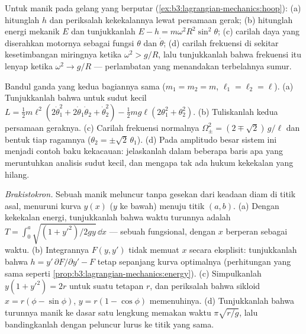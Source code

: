 \begin{exercise}[$\star\star$]\label{exo:b3:lagrangian-mechanics:9}
Untuk manik pada gelang yang berputar
(\cref{ex:b3:lagrangian-mechanics:hoop}): (a) hitunglah 
$h$ dan periksalah kekekalannya lewat persamaan gerak; (b) hitunglah
energi mekanik $E$ dan tunjukkanlah $E - h =
m\omega^2R^2\sin^2\theta$; (c) carilah daya yang diserahkan motornya
sebagai fungsi $\theta$ dan $\dot\theta$; (d) carilah frekuensi
 di sekitar kesetimbangan miringnya ketika $\omega^2 > g/R$,
lalu tunjukkanlah bahwa frekuensi itu lenyap ketika $\omega^2 \to g/R$
--- perlambatan yang menandakan terbelahnya sumur.
\end{exercise}

\begin{exercise}[$\star\star\star$]\label{exo:b3:lagrangian-mechanics:10}
Bandul ganda yang kedua bagiannya sama ($m_1 = m_2 = m$, $\ell_1 = \ell_2 = \ell$).
(a) Tunjukkanlah bahwa untuk sudut kecil $L = \tfrac12 m\ell^2(2\dot\theta_1^2 +
2\dot\theta_1\dot\theta_2 + \dot\theta_2^2) - \tfrac12 mg\ell(2
\theta_1^2 + \theta_2^2)$. (b) Tuliskanlah kedua persamaan geraknya.
(c) Carilah frekuensi normalnya $\Omega_\pm^2 = (2 \mp \sqrt2)\,g/\ell$
dan bentuk tiap ragamnya ($\theta_2 = \pm\sqrt2\,\theta_1$). (d) Pada
amplitudo besar sistem ini menjadi contoh baku kekacauan: jelaskanlah
dalam beberapa baris apa yang meruntuhkan analisis sudut kecil, dan
mengapa tak ada hukum kekekalan yang hilang.
\end{exercise}

\begin{exercise}[$\star\star\star$]\label{exo:b3:lagrangian-mechanics:11}
\emph{Brakistokron.} Sebuah manik meluncur tanpa gesekan dari keadaan
diam di titik asal, menuruni kurva $y(x)$ ($y$ ke bawah) menuju titik
$(a, b)$. (a) Dengan kekekalan energi, tunjukkanlah bahwa waktu
turunnya adalah $T =
\int_0^a\sqrt{(1 + y'^2)/2gy}\,\dd x$ --- sebuah fungsional, dengan $x$
berperan sebagai waktu. (b) Integrannya $F(y, y')$ tidak memuat $x$
secara eksplisit: tunjukkanlah bahwa
$h = y'\,\partial F/\partial y' - F$ tetap sepanjang kurva optimalnya
(perhitungan yang sama seperti
\cref{prop:b3:lagrangian-mechanics:energy}). (c) Simpulkanlah $y(1 + y'^2) =
2r$ untuk suatu tetapan $r$, dan periksalah bahwa sikloid $x = r(\phi -
\sin\phi)$, $y = r(1 - \cos\phi)$ memenuhinya. (d) Tunjukkanlah bahwa
turunnya manik ke dasar satu lengkung memakan waktu $\pi\sqrt{r/g}$, lalu
bandingkanlah dengan peluncur lurus ke titik yang sama.
\end{exercise}

